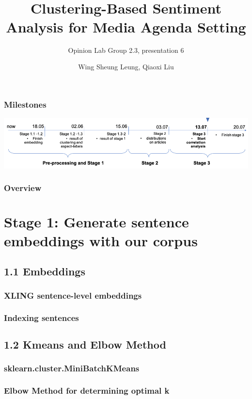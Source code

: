 \documentclass{tum-presentation}
\title[Shortened Title]{Clustering-Based Sentiment Analysis for Media Agenda Setting}
\subtitle{Opinion Lab Group 2.3, presentation 6}
\author{Wing Sheung Leung, Qiaoxi Liu}
\begin{document}
\begin{frame}[noframenumbering]
  \titlepage
\end{frame}
\begin{frame}
  \frametitle{Milestones}
  \vspace{2cm}
 \includegraphics[width = \textwidth]{figures/timeline.pdf}
  
\end{frame}
\begin{frame}[t]
  \frametitle{Overview}
  \tableofcontents[hideallsubsections]
\end{frame}



\section{Stage 1: Generate sentence embeddings with our corpus}

\subsection{1.1 Embeddings}
\subsubsection{XLING sentence-level embeddings}

\subsubsection{Indexing sentences}
\subsection{1.2 Kmeans and Elbow Method}
\subsubsection{sklearn.cluster.MiniBatchKMeans}
\subsubsection{Elbow Method for determining optimal k}
\end{document}
